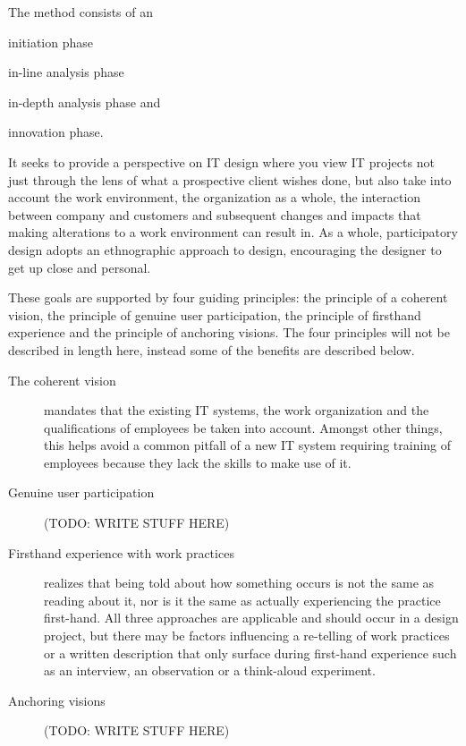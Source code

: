 The \must{}\cite{bodker2004participatory} method consists of an
\begin{inparaenum}[1)]
\item initiation phase
\item in-line analysis phase
\item in-depth analysis phase and
\item innovation phase.
\end{inparaenum}
It seeks to provide a perspective on IT design where you view IT projects not
just through the lens of what a prospective client wishes done, but also take into
account the work environment, the organization as a whole, the interaction
between company and customers and subsequent changes and impacts that making
alterations to a work environment can result in. As a whole, participatory
design adopts an ethnographic approach to design, encouraging the designer to
get up close and personal.

These goals are supported by four guiding principles: the principle of a coherent 
vision, the principle of genuine user participation, the principle of firsthand
experience and the principle of anchoring visions. The four principles will not
be described in length here, instead some of the benefits are described below.

\begin{description}
    \item [The coherent vision] mandates that the existing IT systems, the work organization 
        and the qualifications of employees be taken into account. Amongst other things, 
        this helps avoid a common pitfall of a new IT system requiring training of employees 
        because they lack the skills to make use of it. 
    \item [Genuine user participation] (TODO: WRITE STUFF HERE)
    \item [Firsthand experience with work practices] realizes that being told
        about how something occurs is not the same as reading about it, nor is
        it the same as actually experiencing the practice first-hand. All three
        approaches are applicable and should occur in a design project, but
        there may be factors influencing a re-telling of work practices or a
        written description that only surface during first-hand experience such
        as an interview, an observation or a think-aloud experiment.
    \item [Anchoring visions] (TODO: WRITE STUFF HERE)
\end{description}

